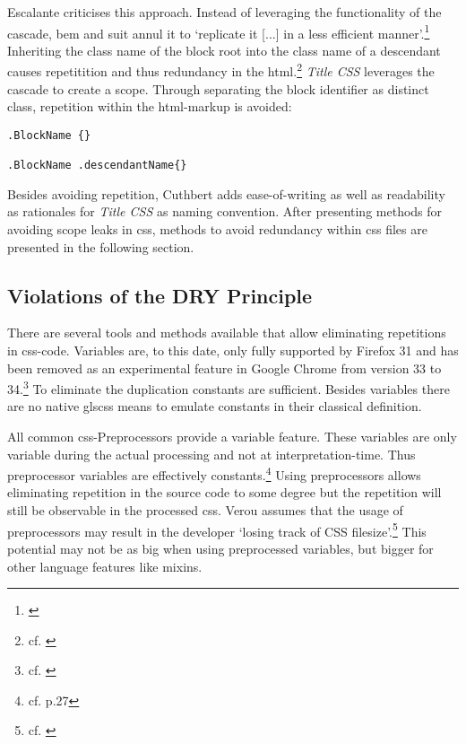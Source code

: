 Escalante criticises this approach.
Instead of leveraging the functionality of the cascade, \gls{bem} and \gls{suit} annul it to `replicate it [...] in a less efficient manner'.\footnote{\cite{mpgcss}}
Inheriting the class name of the block root into the class name of a descendant causes repetitition and thus redundancy in the \gls{html}.\footnote{cf. \cite{mpgcss}}
{\slshape Title CSS} leverages the cascade to create a scope.
Through separating the block identifier as distinct class, repetition within the \gls{html}-markup is avoided:

\begin{verbatim}
.BlockName {}

.BlockName .descendantName{}
\end{verbatim}
Besides avoiding repetition, Cuthbert adds ease-of-writing as well as readability as rationales for {\slshape Title CSS} as naming convention.
After presenting methods for avoiding scope leaks in \gls{css}, methods to avoid redundancy within \gls{css} files are presented in the following section.






\subsection*{Violations of the DRY Principle}
There are several tools and methods available that allow eliminating repetitions in \gls{css}-code.
Variables are, to this date, only fully supported by Firefox 31 and has been removed as an experimental feature in Google Chrome from version 33 to 34.\footnote{cf. \cite{cssvariables}}
To eliminate the duplication constants are sufficient.
Besides variables there are no native gls{css} means to emulate constants in their classical definition.

All common \gls{css}-Preprocessors provide a variable feature.
These variables are only variable during the actual processing and not at interpretation-time.
Thus preprocessor variables are effectively constants.\footnote{cf. \cite{wirthpreprocessors} p.27}
Using preprocessors allows eliminating repetition in the source code to some degree
but the repetition will still be observable in the processed \gls{css}.
Verou assumes that the usage of preprocessors may result in the developer `losing track of CSS filesize'.\footnote{cf. \cite{veroupreprocessors}}
This potential may not be as big when using preprocessed variables, but bigger for other language features like mixins.

